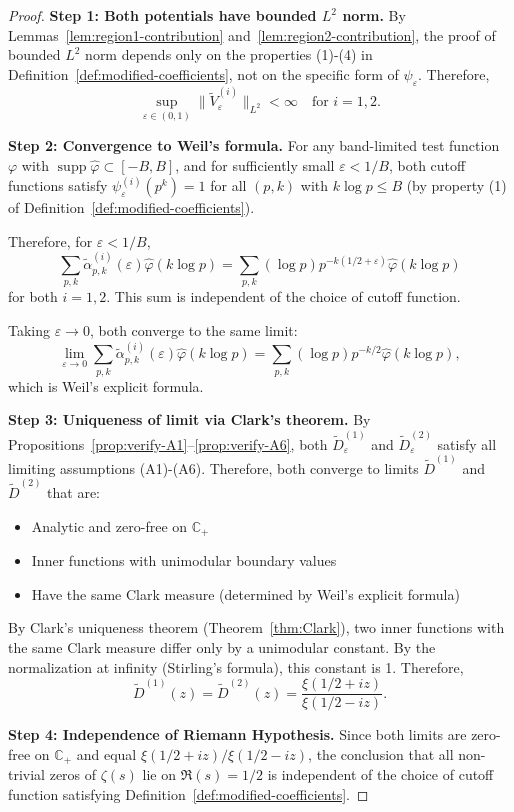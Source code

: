 ﻿\documentclass[12pt,a4paper]{article}
\theoremstyle{definition}
\theoremstyle{remark}
\newcommand{\CC}{\mathbb{C}}
\newcommand{\supp}{\operatorname{supp}}
\begin{document}
\begin{proof}
\textbf{Step 1: Both potentials have bounded $L^2$ norm.}
By Lemmas~\ref{lem:region1-contribution} and~\ref{lem:region2-contribution}, the proof of bounded $L^2$ norm depends only on the properties (1)-(4) in Definition~\ref{def:modified-coefficients}, not on the specific form of $\psi_\varepsilon$. Therefore,
\[
  \sup_{\varepsilon \in (0,1)} \|\widetilde{V}_\varepsilon^{(i)}\|_{L^2} < \infty \quad \text{for } i = 1, 2.
\]

\textbf{Step 2: Convergence to Weil's formula.}
For any band-limited test function $\varphi$ with $\supp \widehat{\varphi} \subset [-B, B]$, and for sufficiently small $\varepsilon < 1/B$, both cutoff functions satisfy $\psi_\varepsilon^{(i)}(p^k) = 1$ for all $(p,k)$ with $k \log p \leq B$ (by property (1) of Definition~\ref{def:modified-coefficients}).

Therefore, for $\varepsilon < 1/B$,
\[
  \sum_{p,k} \widetilde{\alpha}_{p,k}^{(i)}(\varepsilon) \widehat{\varphi}(k\log p) = \sum_{p,k} (\log p) p^{-k(1/2+\varepsilon)} \widehat{\varphi}(k\log p)
\]
for both $i = 1, 2$. This sum is independent of the choice of cutoff function.

Taking $\varepsilon \to 0$, both converge to the same limit:
\[
  \lim_{\varepsilon \to 0} \sum_{p,k} \widetilde{\alpha}_{p,k}^{(i)}(\varepsilon) \widehat{\varphi}(k\log p) = \sum_{p,k} (\log p) p^{-k/2} \widehat{\varphi}(k\log p),
\]
which is Weil's explicit formula.

\textbf{Step 3: Uniqueness of limit via Clark's theorem.}
By Propositions~\ref{prop:verify-A1}--\ref{prop:verify-A6}, both $\widetilde{D}_\varepsilon^{(1)}$ and $\widetilde{D}_\varepsilon^{(2)}$ satisfy all limiting assumptions (A1)-(A6). Therefore, both converge to limits $\widetilde{D}^{(1)}$ and $\widetilde{D}^{(2)}$ that are:
\begin{itemize}
\item Analytic and zero-free on $\CC_+$
\item Inner functions with unimodular boundary values
\item Have the same Clark measure (determined by Weil's explicit formula)
\end{itemize}

By Clark's uniqueness theorem (Theorem~\ref{thm:Clark}), two inner functions with the same Clark measure differ only by a unimodular constant. By the normalization at infinity (Stirling's formula), this constant is 1. Therefore,
\[
  \widetilde{D}^{(1)}(z) = \widetilde{D}^{(2)}(z) = \frac{\xi(1/2+iz)}{\xi(1/2-iz)}.
\]

\textbf{Step 4: Independence of Riemann Hypothesis.}
Since both limits are zero-free on $\CC_+$ and equal $\xi(1/2+iz)/\xi(1/2-iz)$, the conclusion that all non-trivial zeros of $\zeta(s)$ lie on $\Re(s) = 1/2$ is independent of the choice of cutoff function satisfying Definition~\ref{def:modified-coefficients}.
\end{proof}
\end{document}
